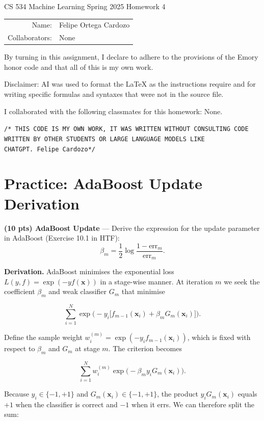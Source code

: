 \documentclass[a4paper,12pt]{article}
\newcommand{\bx}{\mathbf{x}}
\begin{document}
\begin{center}
{\Large CS 534 Machine Learning Spring 2025 Homework 4}
\vspace{.8cm}
\begin{tabular}{rl}
Name: & Felipe Ortega Cardozo \\
Collaborators: & None
\end{tabular}
\end{center}

By turning in this assignment, I declare to adhere to the provisions of the Emory honor code
and that all of this is my own work.

\noindent Disclaimer: AI was used to format the \LaTeX{} as the instructions require and for
writing specific formulas and syntaxes that were not in the source file.

I collaborated with the following classmates for this homework: None.

\texttt{/* THIS CODE IS MY OWN WORK, IT WAS WRITTEN WITHOUT CONSULTING CODE WRITTEN BY
OTHER STUDENTS OR LARGE LANGUAGE MODELS LIKE CHATGPT.~Felipe Cardozo*/}

\section{Practice: AdaBoost Update Derivation}

\textbf{(10 pts) AdaBoost Update} — Derive the expression for the update parameter in
AdaBoost (Exercise 10.1 in HTF):
\[
    \beta_m = \frac{1}{2}\log\frac{1-\mathrm{err}_m}{\mathrm{err}_m}.
\]

\textbf{Derivation.}
AdaBoost minimises the exponential loss $L(y, f) = \exp(-yf(\bx))$ in a stage-wise manner.
At iteration $m$ we seek the coefficient $\beta_m$ and weak classifier $G_m$ that minimise

\[
    \sum_{i=1}^{N} \exp\!\bigl(-y_i \bigl[f_{m-1}(\bx_i) + \beta_m G_m(\bx_i)\bigr]\bigr).
\]

Define the sample weight $w_i^{(m)} = \exp(-y_i f_{m-1}(\bx_i))$, which is fixed with
respect to $\beta_m$ and $G_m$ at stage $m$. The criterion becomes

\[
    \sum_{i=1}^{N} w_i^{(m)} \exp\!\bigl(-\beta_m y_i G_m(\bx_i)\bigr).
\]

Because $y_i \in \{-1,+1\}$ and $G_m(\bx_i) \in \{-1,+1\}$, the product
$y_i G_m(\bx_i)$ equals $+1$ when the classifier is correct and $-1$ when it errs.
We can therefore split the sum:
\end{document}
